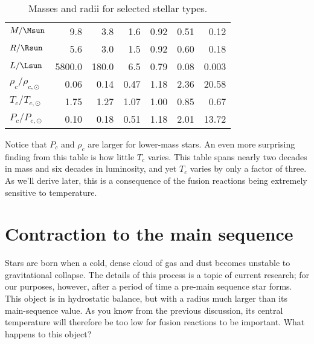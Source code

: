 \begin{table}
\caption{\label{t.stellar-properties} Masses and radii for selected stellar types.}
\begin{tabular}{ld{4.2}d{3.2}d{1.2}d{1.2}d{1.2}d{2.3}}
 &  &  &  &  &  & \\ 
\hline
$M/\Msun$ & 9.8 & 3.8 & 1.6 & 0.92 & 0.51 & 0.12\\
$R/\Rsun$ & 5.6 & 3.0 & 1.5 & 0.92 & 0.60 & 0.18\\
$L/\Lsun$ & 5800.0    & 180.0 & 6.5 & 0.79 & 0.08 & 0.003\\
$\rho_{c}/\rho_{c,\odot}$ & 0.06 & 0.14 & 0.47 & 1.18 & 2.36 & 20.58\\
$T_{c}/T_{c,\odot}$ & 1.75 & 1.27 & 1.07 & 1.00 & 0.85 & 0.67\\
$P_{c}/P_{c,\odot}$ & 0.10 & 0.18 & 0.51 & 1.18 & 2.01 & 13.72\\
\end{tabular}
\end{table}

Notice that $P_{c}$ and $\rho_{c}$ are larger for lower-mass stars. An even more surprising finding from this table is how little $T_{c}$ varies. This table spans nearly two decades in mass and six decades in luminosity, and yet $T_{c}$ varies by only a factor of three.  As we'll derive later, this is a consequence of the fusion reactions being extremely sensitive to temperature.

\section{Contraction to the main sequence}
\label{s.stellar-contraction}

Stars are born when a cold, dense cloud of gas and dust becomes unstable to gravitational collapse. The details of this process is a topic of current research; for our purposes, however, after a period of time a pre-main sequence star forms.  This object is in hydrostatic balance, but with a radius much larger than its main-sequence value.  As you know from the previous discussion, its central temperature will therefore be too low for fusion reactions to be important.  What happens to this object?

